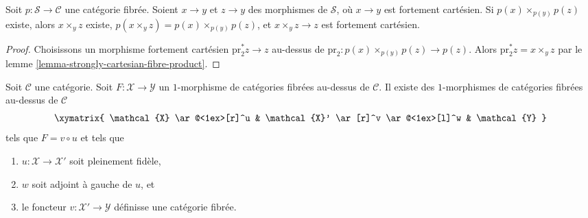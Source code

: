 \begin{lemma}
\label{lemma-fibred-category-representable-goes-up}
Soit $p : \mathcal{S} \to \mathcal{C}$ une catégorie fibrée.
Soient $x \to y$ et $z \to y$ des morphismes de $\mathcal{S}$,
où $x \to y$ est fortement cartésien. Si
$p(x) \times_{p(y)} p(z)$ existe, alors $x \times_y z$ existe,
$p(x \times_y z) = p(x) \times_{p(y)} p(z)$, et
$x \times_y z \to z$ est fortement cartésien.
\end{lemma}

\begin{proof}
Choisissons un morphisme fortement cartésien
$\text{pr}_2^*z \to z$ au-dessus de
$\text{pr}_2 : p(x) \times_{p(y)} p(z) \to p(z)$. Alors
$\text{pr}_2^*z = x \times_y z$ par le
lemme \ref{lemma-strongly-cartesian-fibre-product}.
\end{proof}

\begin{lemma}
\label{lemma-ameliorate-morphism-fibred-categories}
Soit $\mathcal{C}$ une catégorie. Soit
$F : \mathcal{X} \to \mathcal{Y}$ un $1$-morphisme de catégories fibrées
au-dessus de $\mathcal{C}$.
Il existe des $1$-morphismes de catégories fibrées au-dessus de
$\mathcal{C}$
$$
\xymatrix{
\mathcal{X} \ar@<1ex>[r]^u &
\mathcal{X}' \ar[r]^v \ar@<1ex>[l]^w & \mathcal{Y}
}
$$
tels que $F = v \circ u$ et tels que
\begin{enumerate}
\item $u : \mathcal{X} \to \mathcal{X}'$ soit pleinement fidèle,
\item $w$ soit adjoint à gauche de $u$, et
\item le foncteur $v : \mathcal{X}' \to \mathcal{Y}$ définisse une
catégorie fibrée.
\end{enumerate}
\end{lemma}

